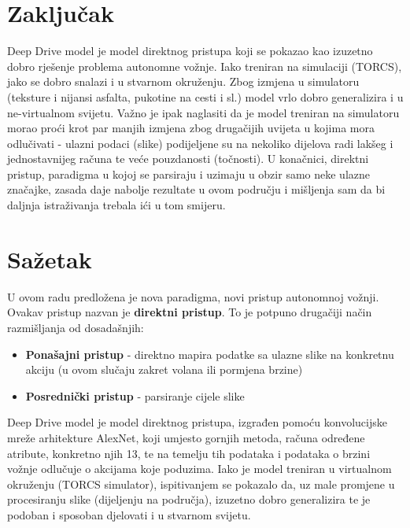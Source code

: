\documentclass[seminar, utf8, numeric]{fer}
\begin{document}
\chapter{Zaključak}
Deep Drive model je model direktnog pristupa koji se pokazao kao izuzetno dobro rješenje problema autonomne vožnje. Iako treniran na simulaciji (TORCS), jako se dobro snalazi i u stvarnom okruženju. Zbog izmjena u simulatoru (teksture i nijansi asfalta, pukotine na cesti i sl.) model vrlo dobro generalizira i u ne-virtualnom svijetu. Važno je ipak naglasiti da je model treniran na simulatoru morao proći krot par manjih izmjena zbog drugačijih uvijeta u kojima mora odlučivati - ulazni podaci (slike) podijeljene su na nekoliko dijelova radi lakšeg i jednostavnijeg računa te veće pouzdanosti (točnosti). U konačnici, direktni pristup, paradigma u kojoj se parsiraju i uzimaju u obzir samo neke ulazne značajke, zasada daje nabolje rezultate u ovom području i mišljenja sam da bi daljnja istraživanja trebala ići u tom smijeru.




\chapter{Sažetak}
U ovom radu predložena je nova paradigma, novi pristup autonomnoj vožnji. Ovakav pristup nazvan je \textbf{direktni pristup}. To je potpuno drugačiji način razmišljanja od dosadašnjih:
\begin{itemize}
	\item \textbf{Ponašajni pristup} - direktno mapira podatke sa ulazne slike na konkretnu akciju (u ovom slučaju zakret volana ili pormjena brzine)
	\item \textbf{Posrednički pristup} - parsiranje cijele slike
\end{itemize}
Deep Drive model je model direktnog pristupa, izgrađen pomoću konvolucijske mreže arhitekture AlexNet, koji umjesto gornjih metoda, računa određene atribute, konkretno njih 13, te na temelju tih podataka i podataka o brzini vožnje odlučuje o akcijama koje poduzima. Iako je model treniran u virtualnom okruženju (TORCS simulator), ispitivanjem se pokazalo da, uz male promjene u procesiranju slike (dijeljenju na područja), izuzetno dobro generalizira te je podoban i sposoban djelovati i u stvarnom svijetu.
\end{document}
